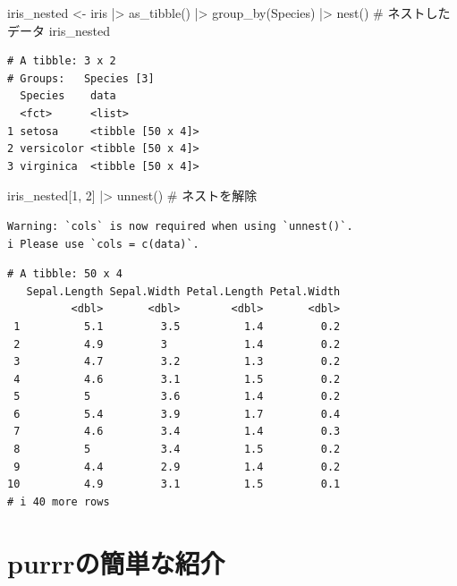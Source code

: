 \documentclass[
  letterpaper,
  DIV=11,
  numbers=noendperiod]{scrreprt}
\newenvironment{Shaded}{\begin{snugshade}}{\end{snugshade}}
\newcommand{\CommentTok}[1]{\textcolor[rgb]{0.37,0.37,0.37}{#1}}
\newcommand{\DecValTok}[1]{\textcolor[rgb]{0.68,0.00,0.00}{#1}}
\newcommand{\FunctionTok}[1]{\textcolor[rgb]{0.28,0.35,0.67}{#1}}
\newcommand{\NormalTok}[1]{\textcolor[rgb]{0.00,0.23,0.31}{#1}}
\newcommand{\OtherTok}[1]{\textcolor[rgb]{0.00,0.23,0.31}{#1}}
\newcommand{\SpecialCharTok}[1]{\textcolor[rgb]{0.37,0.37,0.37}{#1}}
\begin{document}
\begin{Shaded}
\begin{Highlighting}[]
\NormalTok{iris\_nested }\OtherTok{\textless{}{-}}\NormalTok{ iris }\SpecialCharTok{|\textgreater{}} \FunctionTok{as\_tibble}\NormalTok{() }\SpecialCharTok{|\textgreater{}} \FunctionTok{group\_by}\NormalTok{(Species) }\SpecialCharTok{|\textgreater{}} \FunctionTok{nest}\NormalTok{() }\CommentTok{\# ネストしたデータ}
\NormalTok{iris\_nested}
\end{Highlighting}
\end{Shaded}

\begin{verbatim}
# A tibble: 3 x 2
# Groups:   Species [3]
  Species    data             
  <fct>      <list>           
1 setosa     <tibble [50 x 4]>
2 versicolor <tibble [50 x 4]>
3 virginica  <tibble [50 x 4]>
\end{verbatim}

\begin{Shaded}
\begin{Highlighting}[]
\NormalTok{iris\_nested[}\DecValTok{1}\NormalTok{, }\DecValTok{2}\NormalTok{] }\SpecialCharTok{|\textgreater{}} \FunctionTok{unnest}\NormalTok{() }\CommentTok{\# ネストを解除}
\end{Highlighting}
\end{Shaded}

\begin{verbatim}
Warning: `cols` is now required when using `unnest()`.
i Please use `cols = c(data)`.
\end{verbatim}

\begin{verbatim}
# A tibble: 50 x 4
   Sepal.Length Sepal.Width Petal.Length Petal.Width
          <dbl>       <dbl>        <dbl>       <dbl>
 1          5.1         3.5          1.4         0.2
 2          4.9         3            1.4         0.2
 3          4.7         3.2          1.3         0.2
 4          4.6         3.1          1.5         0.2
 5          5           3.6          1.4         0.2
 6          5.4         3.9          1.7         0.4
 7          4.6         3.4          1.4         0.3
 8          5           3.4          1.5         0.2
 9          4.4         2.9          1.4         0.2
10          4.9         3.1          1.5         0.1
# i 40 more rows
\end{verbatim}

\hypertarget{purrrux306eux7c21ux5358ux306aux7d39ux4ecb}{%
\section{purrrの簡単な紹介}\label{purrrux306eux7c21ux5358ux306aux7d39ux4ecb}}
\end{document}
